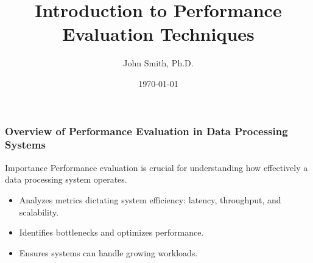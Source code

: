 \documentclass[aspectratio=169]{beamer}
\begin{document}
\frame{\titlepage}

\begin{frame}[fragile]
    \title{Introduction to Performance Evaluation Techniques}
    \author{John Smith, Ph.D.}
    \date{\today}
    \maketitle
\end{frame}

\begin{frame}[fragile]
    \frametitle{Overview of Performance Evaluation in Data Processing Systems}
    \begin{block}{Importance}
        Performance evaluation is crucial for understanding how effectively a data processing system operates. 
    \end{block}
    \begin{itemize}
        \item Analyzes metrics dictating system efficiency: latency, throughput, and scalability.
        \item Identifies bottlenecks and optimizes performance.
        \item Ensures systems can handle growing workloads.
    \end{itemize}
\end{frame}
\end{document}
